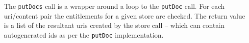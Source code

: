 The \verb+putDocs+ call is a wrapper around a loop to the \verb+putDoc+ call. For each
uri/content pair the entitlements for a given store are checked. The return value
is a list of the resultant uris created by the store call -- which can contain autogenerated
ids as per the \verb+putDoc+ implementation.

